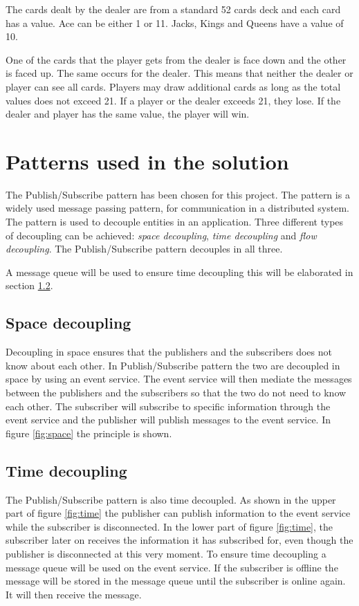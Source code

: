 The cards dealt by the dealer are from a standard 52 cards deck and each card has a value. Ace can be either 1 or 11. Jacks, Kings and Queens have a value of 10.  

One of the cards that the player gets from the dealer is face down and the other is faced up. The same occurs for the dealer. This means that neither the dealer or player can see all cards. Players may draw additional cards as long as the total values does not exceed 21. If a player or the dealer exceeds 21, they lose. If the dealer and player has the same value, the player will win.

\section{Patterns used in the solution}
\label{chp:patterns}
The Publish/Subscribe pattern has been chosen for this project. The pattern is a widely used message passing pattern, for communication in a distributed system. The pattern is used to decouple entities in an application. Three different types of decoupling can be achieved: \emph{space decoupling}, \emph{time decoupling} and \emph{flow decoupling}. The Publish/Subscribe pattern decouples in all three. 

A message queue will be used to ensure time decoupling this will be elaborated in section \ref{sec:time}.

\subsection{Space decoupling}
Decoupling in space ensures that the publishers and the subscribers does not know about each other. In Publish/Subscribe pattern the two are decoupled in space by using an event service. The event service will then mediate the messages between the publishers and the subscribers so that the two do not need to know each other. The subscriber will subscribe to specific information through the event service and the publisher will publish messages to the event service. In figure \ref{fig:space} the principle is shown.


\subsection{Time decoupling}
\label{sec:time}
The Publish/Subscribe pattern is also time decoupled. As shown in the upper part of figure \ref{fig:time} the publisher can publish information to the event service while the subscriber is disconnected. In the lower part of figure \ref{fig:time}, the subscriber later on receives the information it has subscribed for, even though the publisher is disconnected at this very moment. To ensure time decoupling a message queue will be used on the event service. If the subscriber is offline the message will be stored in the message queue until the subscriber is online again. It will then receive the message.

